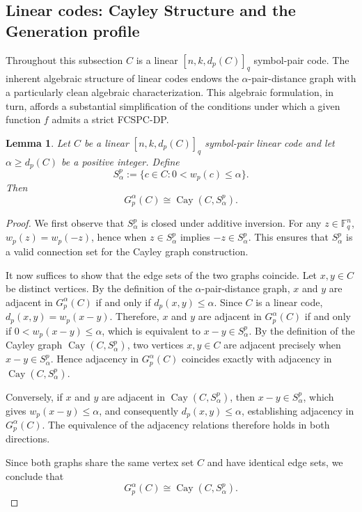 \documentclass[11pt,draftclsnofoot,journal,onecolumn]{IEEEtran}
\newtheorem{lemma}{Lemma}
\begin{document}
     \subsection{Linear codes: Cayley Structure and the Generation profile}

    Throughout this subsection $C$ is a linear $[n,k,d_p(C)]_q$ symbol-pair code. The inherent algebraic structure of linear codes endows the \(\alpha\)-pair-distance graph with a particularly clean algebraic characterization. This algebraic formulation, in turn, affords a substantial simplification of the conditions under which a given function \(f\) admits a strict FCSPC-DP.

    

    \begin{lemma}\label{lem:cayley-pair}
    Let \(C\) be a linear $[n,k,d_p(C)]_q$ symbol-pair linear code and let \(\alpha \ge d_p(C)\) be a positive integer. Define
    \[
    S_\alpha^p := \{ c \in C : 0 < w_p(c) \le \alpha \}.
    \]
    Then 
    \[
        G_p^{\alpha}(C) \cong \operatorname{Cay}(C, S_\alpha^p).
    \]
    \end{lemma}

    \begin{proof}
    We first observe that \(S_\alpha^p\) is closed under additive inversion. For any \(z \in \mathbb{F}_q^n\), \(w_p(z) = w_p(-z)\), hence when \(z \in S_\alpha^p\) implies \(-z \in S_\alpha^p\). This ensures that \(S_\alpha^p\) is a valid connection set for the Cayley graph construction.

    It now suffices to show that the edge sets of the two graphs coincide. Let \(x, y \in C\) be distinct vertices. By the definition of the \(\alpha\)-pair-distance graph, \(x\) and \(y\) are adjacent in \(G_p^{\alpha}(C)\) if and only if $d_p(x, y) \le \alpha$.
    Since \(C\) is a linear code, $d_p(x, y) = w_p(x - y)$. Therefore, \(x\) and \(y\) are adjacent in \(G_p^{\alpha}(C)\) if and only if $0 < w_p(x - y) \le \alpha$, which is equivalent to \(x - y \in S_\alpha^p\). By the definition of the Cayley graph \(\operatorname{Cay}(C, S_\alpha^p)\), two vertices \(x, y \in C\) are adjacent precisely when \(x - y \in S_\alpha^p\). Hence adjacency in \(G_p^{\alpha}(C)\) coincides exactly with adjacency in \(\operatorname{Cay}(C, S_\alpha^p)\).

    Conversely, if \(x\) and \(y\) are adjacent in \(\operatorname{Cay}(C, S_\alpha^p)\), then \(x - y \in S_\alpha^p\), which gives \(w_p(x - y) \le \alpha\), and consequently \(d_p(x, y) \le \alpha\), establishing adjacency in \(G_p^{\alpha}(C)\). The equivalence of the adjacency relations therefore holds in both directions.

    Since both graphs share the same vertex set \(C\) and have identical edge sets, we conclude that
    \[
    G_p^{\alpha}(C) \cong \operatorname{Cay}(C, S_\alpha^p).
    \]
    \end{proof}
\end{document}
